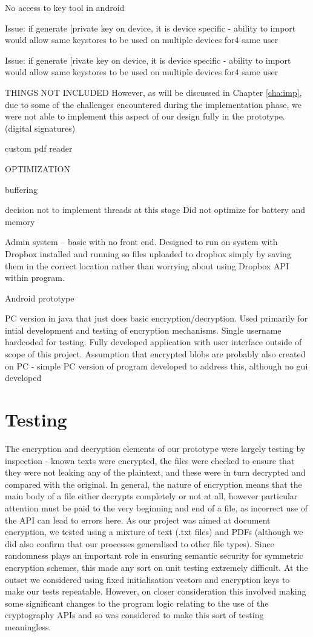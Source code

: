 No access to key tool in android

Issue: if generate [private key on device, it is device specific - ability to import would allow same keystores to be used on multiple devices for4 same user


Issue: if generate [rivate key on device, it is device specific - ability to import would allow same keystores to be used on multiple devices for4 same user

THINGS NOT INCLUDED
However, as will be discussed in Chapter \ref{cha:imp}, due to some of the challenges encountered during the implementation phase, we were not able to implement this aspect of our design fully in the prototype. (digital signatures)

custom pdf reader

OPTIMIZATION

buffering

decision not to implement threads at this stage
Did not optimize for battery and memory



Admin system – basic with no front end.  Designed to run on system with Dropbox installed and running so files uploaded to dropbox simply by saving them in the correct location rather than worrying about using Dropbox API within program.

Android prototype

PC version in java that just does basic encryption/decryption.  Used primarily for intial development and testing of encryption mechanisms. Single username hardcoded for testing. Fully developed application with user interface outside of scope of this project. Assumption that encrypted blobs are probably also created on PC - simple PC version of program developed to address this, although no gui developed
\section{Testing}

The encryption and decryption elements of our prototype were largely testing by inspection - known texts were encrypted, the files were checked to ensure that they were not leaking any of the plaintext, and these were in turn decrypted and compared with the original.   In general, the nature of encryption means that the main body of a file either decrypts completely or not at all, however particular attention must be paid to the very beginning and end of a file, as incorrect use of the API can lead to errors here.  As our project was aimed at document encryption, we tested using a mixture of text (.txt files) and PDFs (although we did also confirm that our processes generalised to other file types).  Since randomness plays an important role in ensuring  semantic security  for symmetric encryption schemes, this made any sort on unit testing extremely difficult.  At the outset we considered using fixed initialisation vectors and encryption keys to make our tests repeatable.  However, on closer consideration this involved making some significant changes to the program logic relating to the use of the cryptography APIs and so was considered to make this sort of testing meaningless.  

